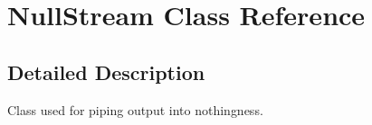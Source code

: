 \section{NullStream Class Reference}
\label{classNullStream}


\subsection{Detailed Description}
Class used for piping output into nothingness. 